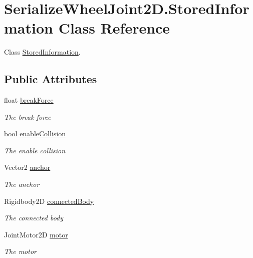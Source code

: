 \hypertarget{class_serialize_wheel_joint2_d_1_1_stored_information}{}\section{Serialize\+Wheel\+Joint2\+D.\+Stored\+Information Class Reference}
\label{class_serialize_wheel_joint2_d_1_1_stored_information}


Class \hyperlink{class_serialize_wheel_joint2_d_1_1_stored_information}{Stored\+Information}.  


\subsection*{Public Attributes}
\begin{DoxyCompactItemize}
\item 
float \hyperlink{class_serialize_wheel_joint2_d_1_1_stored_information_a74047ba684f05a51888411a6504f62ff}{break\+Force}
\begin{DoxyCompactList}\small\item\em The break force \end{DoxyCompactList}\item 
bool \hyperlink{class_serialize_wheel_joint2_d_1_1_stored_information_aa5e7ca53abf20cc2b5f21eb26880d49b}{enable\+Collision}
\begin{DoxyCompactList}\small\item\em The enable collision \end{DoxyCompactList}\item 
Vector2 \hyperlink{class_serialize_wheel_joint2_d_1_1_stored_information_a3e064e6e94be24b60ad7737ad781d32a}{anchor}
\begin{DoxyCompactList}\small\item\em The anchor \end{DoxyCompactList}\item 
Rigidbody2D \hyperlink{class_serialize_wheel_joint2_d_1_1_stored_information_af7760a3218b5b015873318ce4978a6b1}{connected\+Body}
\begin{DoxyCompactList}\small\item\em The connected body \end{DoxyCompactList}\item 
Joint\+Motor2D \hyperlink{class_serialize_wheel_joint2_d_1_1_stored_information_a3446899e56357ddb55bf1baa9851b566}{motor}
\begin{DoxyCompactList}\small\item\em The motor \end{DoxyCompactList}\item 

\end{DoxyCompactItemize}
